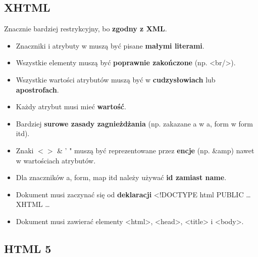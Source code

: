 \documentclass[../main.tex]{subfiles}
\begin{document}
    \subsection{XHTML}
    Znacznie bardziej restrykcyjny, bo \textbf{zgodny z XML}.
    \begin{itemize}
        \item Znaczniki i atrybuty w muszą być pisane \textbf{małymi literami}.
        \item Wszystkie elementy muszą być \textbf{poprawnie zakończone} (np. <br/>).
        \item Wszystkie wartości atrybutów muszą być w \textbf{cudzysłowiach} lub \textbf{apostrofach}.
        \item Każdy atrybut musi mieć \textbf{wartość}.
        \item Bardziej \textbf{surowe zasady zagnieżdżania} (np. zakazane a w a, form w form itd).
        \item Znaki $< >$ \& ' " muszą być reprezentowane przez \textbf{encje} (np. \&amp) nawet w wartościach atrybutów.
        \item Dla znaczników a, form, map itd należy używać \textbf{id zamiast name}.
        \item Dokument musi zaczynać się od \textbf{deklaracji} <!DOCTYPE html PUBLIC \dots XHTML \dots
        \item Dokument musi zawierać elementy <html>, <head>, <title> i <body>.
    \end{itemize}

    \subsection{HTML 5}
\end{document}
